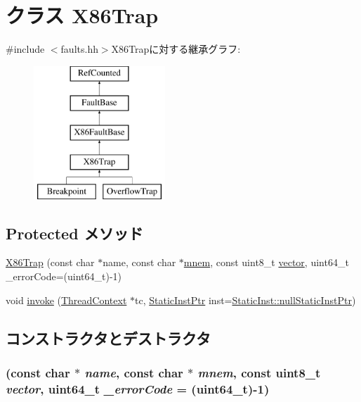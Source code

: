 \hypertarget{classX86ISA_1_1X86Trap}{
\section{クラス X86Trap}
\label{classX86ISA_1_1X86Trap}
}


{\ttfamily \#include $<$faults.hh$>$}X86Trapに対する継承グラフ:\begin{figure}[H]
\begin{center}
\leavevmode
\includegraphics[height=5cm]{classX86ISA_1_1X86Trap}
\end{center}
\end{figure}
\subsection*{Protected メソッド}
\begin{DoxyCompactItemize}
\item 
\hyperlink{classX86ISA_1_1X86Trap_a965b524e8b8451864f5962314520f9d7}{X86Trap} (const char $\ast$name, const char $\ast$\hyperlink{classX86ISA_1_1X86FaultBase_a7bb17f43dadf35d103ef6a25b64c4e9f}{mnem}, const uint8\_\-t \hyperlink{classX86ISA_1_1X86FaultBase_ae369101f45bd256ca2745204afe38a47}{vector}, uint64\_\-t \_\-errorCode=(uint64\_\-t)-\/1)
\item 
void \hyperlink{classX86ISA_1_1X86Trap_a2bd783b42262278d41157d428e1f8d6f}{invoke} (\hyperlink{classThreadContext}{ThreadContext} $\ast$tc, \hyperlink{classRefCountingPtr}{StaticInstPtr} inst=\hyperlink{classStaticInst_aa793d9793af735f09096369fb17567b6}{StaticInst::nullStaticInstPtr})
\end{DoxyCompactItemize}


\subsection{コンストラクタとデストラクタ}
\hypertarget{classX86ISA_1_1X86Trap_a965b524e8b8451864f5962314520f9d7}{
\subsubsection[{X86Trap}]{ (const char $\ast$ {\em name}, \/  const char $\ast$ {\em mnem}, \/  const uint8\_\-t {\em vector}, \/  uint64\_\-t {\em \_\-errorCode} = {\ttfamily (uint64\_\-t)-\/1})}}
\label{classX86ISA_1_1X86Trap_a965b524e8b8451864f5962314520f9d7}



